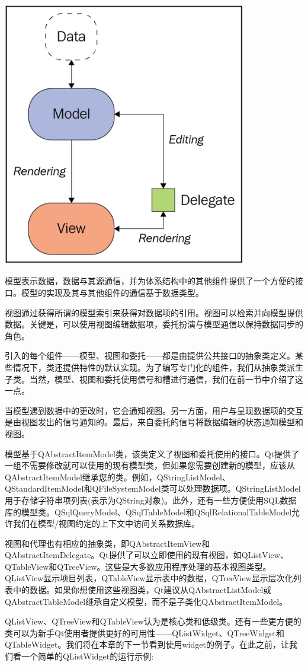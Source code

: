 \begin{center}
	\includegraphics[width=0.8\textwidth]{content/Section-2/Chapter-14/9}
\end{center}

模型表示数据，数据与其源通信，并为体系结构中的其他组件提供了一个方便的接口。模型的实现及其与其他组件的通信基于数据类型。 \par
视图通过获得所谓的模型索引来获得对数据项的引用。视图可以检索并向模型提供数据。关键是，可以使用视图编辑数据项，委托扮演与模型通信以保持数据同步的角色。 \par
引入的每个组件——模型、视图和委托——都是由提供公共接口的抽象类定义。某些情况下，类还提供特性的默认实现。为了编写专门化的组件，我们从抽象类派生子类。当然，模型、视图和委托使用信号和槽进行通信，我们在前一节中介绍了这一点。 \par
当模型遇到数据中的更改时，它会通知视图。另一方面，用户与呈现数据项的交互是由视图发出的信号通知的。最后，来自委托的信号将数据编辑的状态通知模型和视图。 \par
模型基于QAbstractItemModel类，该类定义了视图和委托使用的接口。Qt提供了一组不需要修改就可以使用的现有模型类，但如果您需要创建新的模型，应该从QAbstractItemModel继承您的类。例如，QStringListModel、QStandardItemModel和QFileSystemModel类可以处理数据项。QStringListModel用于存储字符串项列表(表示为QString对象)。此外，还有一些方便使用SQL数据库的模型类。QSqlQueryModel、QSqlTableModel和QSqlRelationalTableModel允许我们在模型/视图约定的上下文中访问关系数据库。 \par
视图和代理也有相应的抽象类，即QAbstractItemView和QAbstractItemDelegate。Qt提供了可以立即使用的现有视图，如QListView、QTableView和QTreeView。这些是大多数应用程序处理的基本视图类型。QListView显示项目列表，QTableView显示表中的数据，QTreeView显示层次化列表中的数据。如果你想使用这些视图类，Qt建议从QAbstractListModel或QAbstractTableModel继承自定义模型，而不是子类化QAbstractItemModel。 \par
QListView、QTreeView和QTableView认为是核心类和低级类。还有一些更方便的类可以为新手Qt使用者提供更好的可用性——QListWidget、QTreeWidget和QTableWidget。我们将在本章的下一节看到使用widget的例子。在此之前，让我们看一个简单的QListWidget的运行示例: \par

